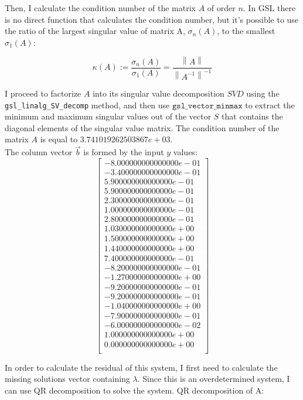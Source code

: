 \documentclass{article}
\newcommand{\code}{\texttt}
\newcommand{\norm}[1]{\left\lVert#1\right\rVert}
\begin{document}
Then, I calculate the condition number of the matrix $A$ of order $n$. In GSL there is no direct function that calculates the condition number, but it's possible to use the ratio of the largest singular value of matrix A, $\sigma_n (A)$, to the smallest $\sigma_1 (A)$:

$$\kappa(A) := \frac{\sigma_n (A)}{\sigma_1 (A)}= \frac{\norm{A}}{\norm{A^{-1}}^{-1}}$$

I proceed to factorize $A$ into its singular value decomposition $SVD$ using the \code{gsl\_linalg\_SV\_decomp} method, and then use $\code{gsl\_vector\_minmax}$ to extract the minimum and maximum singular values out of the vector $S$ that contains the diagonal elements of the singular value matrix. The condition number of the matrix $A$ is equal to $3.741019262503867e+03$.\\



The column vector $\vec{b}$ is formed by the input $y$ values:
$$
\begin{bmatrix} 
-8.000000000000000e-01\\
-3.400000000000000e-01\\
5.900000000000000e-01\\
5.900000000000000e-01\\
2.300000000000000e-01\\
1.000000000000000e-01\\
2.800000000000000e-01\\
1.030000000000000e+00\\
1.500000000000000e+00\\
1.440000000000000e+00\\
7.400000000000000e-01\\
-8.200000000000000e-01\\
-1.270000000000000e+00\\
-9.200000000000000e-01\\
-9.200000000000000e-01\\
-1.040000000000000e+00\\
-7.900000000000000e-01\\
-6.000000000000000e-02\\
1.000000000000000e+00\\
0.000000000000000e+00\\
\end{bmatrix}
$$

In order to calculate the residual of this system, I first need to calculate the missing solutions vector containing $\lambda$. Since this is an overdetermined system, I can use QR decomposition to solve the system. QR decomposition of A:
\end{document}
